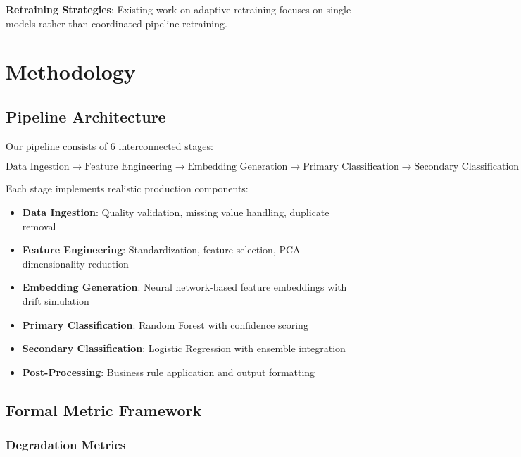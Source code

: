 \documentclass{article}
\begin{document}
\textbf{Retraining Strategies}: Existing work on adaptive retraining focuses on single models rather than coordinated pipeline retraining.

\section{Methodology}

\subsection{Pipeline Architecture}

Our pipeline consists of 6 interconnected stages:

\begin{equation}
\text{Data Ingestion} \rightarrow \text{Feature Engineering} \rightarrow \text{Embedding Generation} \rightarrow \text{Primary Classification} \rightarrow \text{Secondary Classification} \rightarrow \text{Post-Processing}
\end{equation}

Each stage implements realistic production components:

\begin{itemize}
    \item \textbf{Data Ingestion}: Quality validation, missing value handling, duplicate removal
    \item \textbf{Feature Engineering}: Standardization, feature selection, PCA dimensionality reduction
    \item \textbf{Embedding Generation}: Neural network-based feature embeddings with drift simulation
    \item \textbf{Primary Classification}: Random Forest with confidence scoring
    \item \textbf{Secondary Classification}: Logistic Regression with ensemble integration
    \item \textbf{Post-Processing}: Business rule application and output formatting
\end{itemize}

\subsection{Formal Metric Framework}

\subsubsection{Degradation Metrics}
\end{document}
